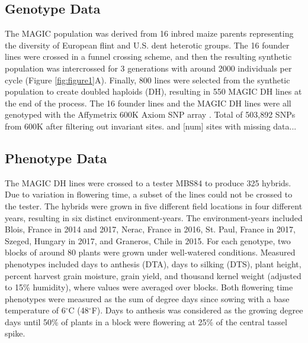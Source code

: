 \documentclass[article,9pt,twocolumn,twoside]{rilabRxiv}
\begin{document}
\subsection{Genotype Data}
The MAGIC population was derived from 16 inbred maize parents representing the diversity of European flint and U.S. dent heterotic groups.
The 16 founder lines were crossed in a funnel crossing scheme, and then the resulting synthetic population was intercrossed for 3 generations with around 2000 individuals per cycle (Figure \ref{fig:figure1}A).
Finally, 800 lines were selected from the synthetic population to create doubled haploids (DH), resulting in 550 MAGIC DH lines at the end of the process. The 16 founder lines and the MAGIC DH lines were all genotyped with the Affymetrix 600K Axiom SNP array \citep{RN13}.
Total of 503,892 SNPs from 600K after filtering out invariant sites.
and [num] sites with missing data...

\subsection{Phenotype Data}
The MAGIC DH lines were crossed to a tester MBS84 to produce 325 hybrids.
Due to variation in flowering time, a subset of the lines could not be crossed to the tester.
The hybrids were grown in five different field locations in four different years, resulting in six distinct environment-years.
The environment-years included Blois, France in 2014 and 2017, Nerac, France in 2016, St. Paul, France in 2017, Szeged, Hungary in 2017, and Graneros, Chile in 2015.
For each genotype, two blocks of around 80 plants were grown under well-watered conditions. Measured phenotypes included days to anthesis (DTA), days to silking (DTS), plant height, percent harvest grain moisture, grain yield, and thousand kernel weight (adjusted to 15\% humidity), where values were averaged over blocks.
Both flowering time phenotypes were measured as the sum of degree days since sowing with a base temperature of 6$^{\circ}$C (48$^{\circ}$F).
Days to anthesis was considered as the growing degree days until 50\% of plants in a block were flowering at 25\% of the central tassel spike.
\end{document}
